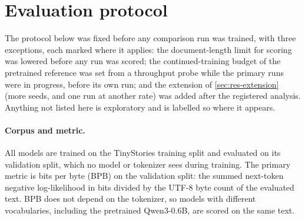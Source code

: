 
\section{Evaluation protocol}
\label{sec:protocol}

The protocol below was fixed before any comparison run was trained, with
three exceptions, each marked where it applies: the document-length limit for
scoring was lowered before any run was scored; the continued-training budget
of the pretrained reference was set from a throughput probe while the primary
runs were in progress, before its own run; and the extension of
\cref{sec:res-extension} (more seeds, and one run at another rate) was added
after the registered analysis. Anything not listed here is exploratory and is
labelled so where it appears.

\paragraph{Corpus and metric.} All models are trained on the TinyStories
training split \citep{eldan2023tinystories} and evaluated on its validation
split, which no model or tokenizer sees during training. The primary metric is
bits per byte (BPB) on the validation split: the summed next-token negative
log-likelihood in bits divided by the UTF-8 byte count of the evaluated text.
BPB does not depend on the tokenizer, so models with different vocabularies,
including the pretrained Qwen3-0.6B, are scored on the same text.

